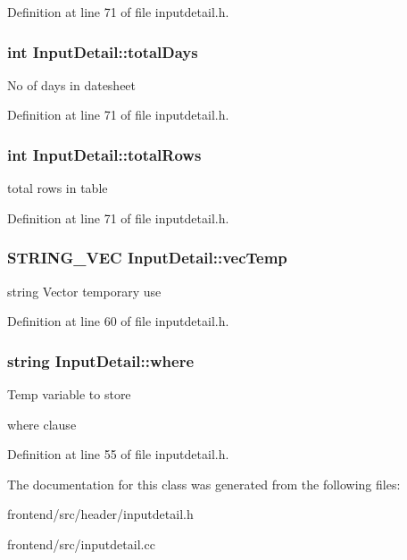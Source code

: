 Definition at line 71 of file inputdetail.\-h.

\hypertarget{classInputDetail_a8d1ba029791bb9b87330400d82cdbcde}{
\subsubsection[{total\-Days}]{\setlength{\rightskip}{0pt plus 5cm}int Input\-Detail\-::total\-Days\hspace{0.3cm}{\ttfamily [protected]}}}\label{classInputDetail_a8d1ba029791bb9b87330400d82cdbcde}
No of days in datesheet 

Definition at line 71 of file inputdetail.\-h.

\hypertarget{classInputDetail_a3710702eafae009629e99f1dc76d5285}{
\subsubsection[{total\-Rows}]{\setlength{\rightskip}{0pt plus 5cm}int Input\-Detail\-::total\-Rows\hspace{0.3cm}{\ttfamily [protected]}}}\label{classInputDetail_a3710702eafae009629e99f1dc76d5285}
total rows in table 

Definition at line 71 of file inputdetail.\-h.

\hypertarget{classInputDetail_abee6a659eb2e34b260aaf8b05d6003b4}{
\subsubsection[{vec\-Temp}]{\setlength{\rightskip}{0pt plus 5cm}S\-T\-R\-I\-N\-G\-\_\-\-V\-E\-C Input\-Detail\-::vec\-Temp\hspace{0.3cm}{\ttfamily [protected]}}}\label{classInputDetail_abee6a659eb2e34b260aaf8b05d6003b4}
string Vector temporary use 

Definition at line 60 of file inputdetail.\-h.

\hypertarget{classInputDetail_a79d8a59940f25f4d2089e241c71a4279}{
\subsubsection[{where}]{\setlength{\rightskip}{0pt plus 5cm}string Input\-Detail\-::where\hspace{0.3cm}{\ttfamily [protected]}}}\label{classInputDetail_a79d8a59940f25f4d2089e241c71a4279}
\begin{DoxyVerb}             Temp variable to store 
\end{DoxyVerb}
 where clause 

Definition at line 55 of file inputdetail.\-h.



The documentation for this class was generated from the following files\-:\begin{DoxyCompactItemize}
\item 
frontend/src/header/inputdetail.\-h\item 
frontend/src/inputdetail.\-cc\end{DoxyCompactItemize}
